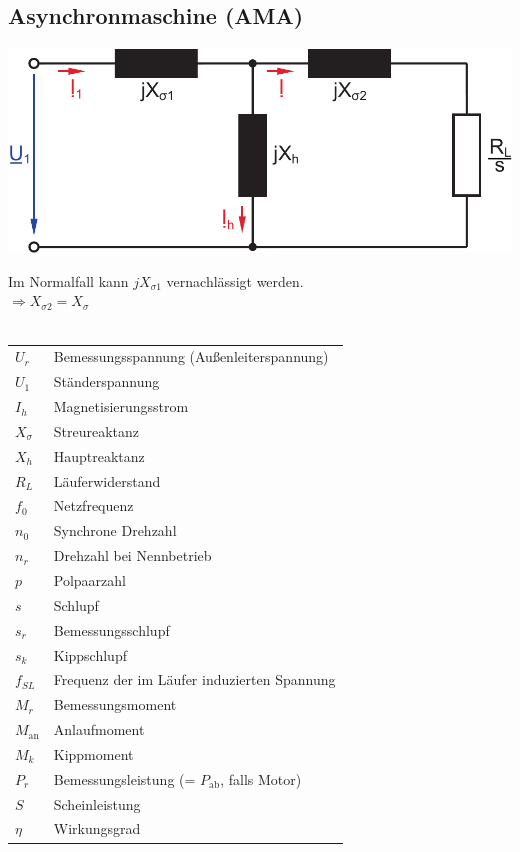 \documentclass[a4paper,twocolumn,10pt]{article}
\begin{document}
\subsection{Asynchronmaschine (AMA)}
\begin{center}
\includegraphics[width=0.9\columnwidth]{Grafiken/Asynchronmaschine}
\end{center}
Im Normalfall kann $jX_{\sigma1}$ vernachlässigt werden.\\
$\Rightarrow X_{\sigma 2}=X_{\sigma}$\\\\
\begin{tabular}{ll}
$U_r$ & Bemessungsspannung (Außenleiterspannung)\\
$U_1$ & Ständerspannung\\
$I_h$ & Magnetisierungsstrom\\
$X_{\sigma}$ & Streureaktanz\\
$X_h$ & Hauptreaktanz\\
$R_L$ & Läuferwiderstand\\
$f_0$ & Netzfrequenz\\
$n_0$ & Synchrone Drehzahl\\
$n_r$ & Drehzahl bei Nennbetrieb\\
$p$ & Polpaarzahl\\
$s$ & Schlupf\\
$s_r$ & Bemessungsschlupf\\
$s_k$ & Kippschlupf\\
$f_{SL}$ & Frequenz der im Läufer induzierten Spannung\\
$M_r$ & Bemessungsmoment\\
$M_{\text{an}}$ & Anlaufmoment\\
$M_k$ & Kippmoment\\
$P_r$ & Bemessungsleistung (= $P_{\text{ab}}$, falls Motor)\\
$S$ & Scheinleistung\\
$\eta$ & Wirkungsgrad
\end{tabular}\\\\\\
\end{document}
